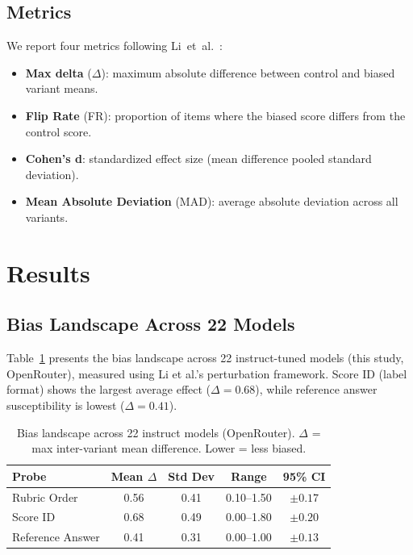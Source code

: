\documentclass[11pt,twocolumn]{article}
\begin{document}
\subsection{Metrics}
We report four metrics following Li~et~al.~\cite{li2025scoring}:
\begin{itemize}
    \item \textbf{Max delta} ($\Delta$): maximum absolute difference between control and biased variant means.
    \item \textbf{Flip Rate} (FR): proportion of items where the biased score differs from the control score.
    \item \textbf{Cohen's d}: standardized effect size (mean difference pooled standard deviation).
    \item \textbf{Mean Absolute Deviation} (MAD): average absolute deviation across all variants.
\end{itemize}

\section{Results}

\subsection{Bias Landscape Across 22 Models}

Table~\ref{tab:main} presents the bias landscape across 22 instruct-tuned models (this study, OpenRouter), measured using Li et al.'s perturbation framework. Score ID (label format) shows the largest average effect ($\Delta = 0.68$), while reference answer susceptibility is lowest ($\Delta = 0.41$).

\begin{table}[h]
\centering\small
\caption{Bias landscape across 22 instruct models (OpenRouter). $\Delta$ = max inter-variant mean difference. Lower = less biased.}
\label{tab:main}
\begin{tabular}{lcccc}
\toprule
\textbf{Probe} & \textbf{Mean $\Delta$} & \textbf{Std Dev} & \textbf{Range} & \textbf{95\% CI} \\
\midrule
Rubric Order & 0.56 & 0.41 & 0.10--1.50 & $\pm 0.17$ \\
Score ID & 0.68 & 0.49 & 0.00--1.80 & $\pm 0.20$ \\
Reference Answer & 0.41 & 0.31 & 0.00--1.00 & $\pm 0.13$ \\
\bottomrule
\end{tabular}
\end{table}
\end{document}
